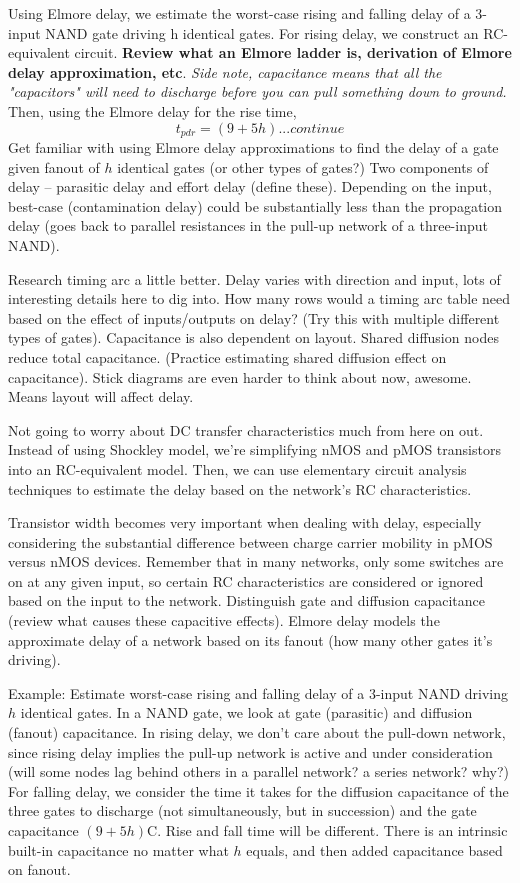 \documentclass{article}
\begin{document}
Using Elmore delay, we estimate the worst-case rising and falling delay of a 3-input NAND gate driving h identical gates. For rising delay, we construct an RC-equivalent circuit. \textbf{Review what an Elmore ladder is, derivation of Elmore delay approximation, etc}. \textit{Side note, capacitance means that all the "capacitors" will need to discharge before you can pull something down to ground.} Then, using the Elmore delay for the rise time, \[
	t_{pdr} = (9+5h) ... \mathrm{\textit{continue}}
\]
Get familiar with using Elmore delay approximations to find the delay of a gate given fanout of \(h\) identical gates (or other types of gates?) Two components of delay -- parasitic delay and effort delay (define these). Depending on the input, best-case (contamination delay) could be substantially less than the propagation delay (goes back to parallel resistances in the pull-up network of a three-input NAND). 

Research timing arc a little better. Delay varies with direction and input, lots of interesting details here to dig into. How many rows would a timing arc table need based on the effect of inputs/outputs on delay? (Try this with multiple different types of gates). Capacitance is also dependent on layout. Shared diffusion nodes reduce total capacitance. (Practice estimating shared diffusion effect on capacitance). Stick diagrams are even harder to think about now, awesome. Means layout will affect delay.

Not going to worry about DC transfer characteristics much from here on out. Instead of using Shockley model, we're simplifying nMOS and pMOS transistors into an RC-equivalent model. Then, we can use elementary circuit analysis techniques to estimate the delay based on the network's RC characteristics. 

Transistor width becomes very important when dealing with delay, especially considering the substantial difference between charge carrier mobility in pMOS versus nMOS devices. Remember that in many networks, only some switches are on at any given input, so certain RC characteristics are considered or ignored based on the input to the network. Distinguish gate and diffusion capacitance (review what causes these capacitive effects). Elmore delay models the approximate delay of a network based on its fanout (how many other gates it's driving).

Example: Estimate worst-case rising and falling delay of a 3-input NAND driving \(h\) identical gates. In a NAND gate, we look at gate (parasitic) and diffusion (fanout) capacitance. In rising delay, we don't care about the pull-down network, since rising delay implies the pull-up network is active and under consideration (will some nodes lag behind others in a parallel network? a series network? why?) For falling delay, we consider the time it takes for the diffusion capacitance of the three gates to discharge (not simultaneously, but in succession) and the gate capacitance \((9+5h)\)C. Rise and fall time will be different. There is an intrinsic built-in capacitance no matter what \(h\) equals, and then added capacitance based on fanout.
\end{document}
